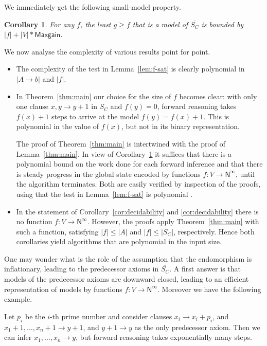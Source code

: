 \documentclass[11pt,a4paper]{article}
\newtheorem{corollary}[theorem]{Corollary}
\newcommand{\N}{\mathsf{N}}
\newcommand\Ninf{\N^\infty}
\newcommand\M{\mathsf{Maxgain}}
\newcommand\upS[1]{\overline{S_{#1}}}
\begin{document}
We immediately get the following small-model property.
\begin{corollary}\label{cor:small-model}
For any $f$, the least $g\geq f$ that is a model of $\upS{C}$
is bounded by $|f|+|V|*\M$.
\end{corollary}

We now analyse the complexity of various results point for point.

\begin{itemize}

\item\label{it:f-sat} The complexity of the test in Lemma~\ref{lem:f-sat}
is clearly polynomial in $|A\to b|$ and $|f|$.

\item In Theorem~\ref{thm:main} our choice for the size of $f$ becomes clear:
with only one clause $x,y \to y+1$ in $S_C$ and $f(y)=0$, forward reasoning
takes $f(x)+1$ steps to arrive at the model $f(y)=f(x)+1$.
This is polynomial in the value of $f(x)$, but not in its
binary representation.

The proof of Theorem~\ref{thm:main} is intertwined with the
proof of Lemma~\ref{thm:main}. In view of Corollary~\ref{cor:small-model}
it suffices that there is a polynomial bound on the work done for each 
forward inference and that there is steady progress in the global state encoded by
functions $f: V\to\Ninf$, until the algorithm terminates.
Both are easily verified by inspection of the proofs,
using that the test in Lemma~\ref{lem:f-sat} is polynomial . 
 
\item\label{it:Coros} In the statement of Corollary~\ref{cor:decidability}
and \ref{cor:decidability} there is no function $f: V\to\Ninf$. 
However, the proofs apply Theorem~\ref{thm:main} with such a function,
satisfying $|f| \leq |A|$ and $|f| \leq |S_C|$, respectively.
Hence both corollaries yield algorithms that are polynomial in the input size.

\end{itemize}

One may wonder what is the role of the assumption that the endomorphism
is inflationary, leading to the predecessor axioms in $\upS{C}$. A first
answer is that models of the predecessor axioms are downward closed,
leading to an efficient representation of models by functions $f: V\to\Ninf$.
Moreover we have the following example.

Let $p_i$ be the $i$-th prime number and consider clauses $x_i \to x_i + p_i$,
and $x_1+1,\ldots,x_n+1 \to y+1$, and $y+1 \to y$ as the only predecessor axiom.
Then we can infer $x_1,\ldots,x_n \to y$, but forward reasoning takes
exponentially many steps. 
\end{document}
